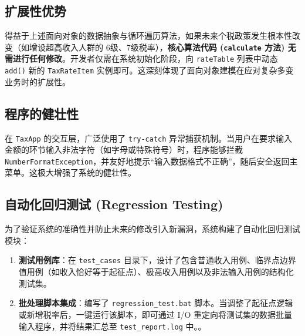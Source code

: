 \documentclass[a4paper]{article}
\begin{document}
\subsection{扩展性优势}
得益于上述面向对象的数据抽象与循环遍历算法，如果未来个税政策发生根本性改变（如增设超高收入人群的 6级、7级税率），\textbf{核心算法代码 (\texttt{calculate} 方法) 无需进行任何修改}。开发者仅需在系统初始化阶段，向 \texttt{rateTable} 列表中动态 \texttt{add()} 新的 \texttt{TaxRateItem} 实例即可。这深刻体现了面向对象建模在应对复杂多变业务时的扩展性。

\subsection{程序的健壮性}
在 \texttt{TaxApp} 的交互层，广泛使用了 \texttt{try-catch} 异常捕获机制。当用户在要求输入金额的环节输入非法字符（如字母或特殊符号）时，程序能够拦截 \texttt{NumberFormatException}，并友好地提示“输入数据格式不正确”，随后安全返回主菜单。这极大增强了系统的健壮性。

\subsection{自动化回归测试 (Regression Testing)}
为了验证系统的准确性并防止未来的修改引入新漏洞，系统构建了自动化回归测试模块：
\begin{enumerate}
    \item \textbf{测试用例库}：在 \texttt{test\_cases} 目录下，设计了包含普通收入用例、临界点边界值用例（如收入恰好等于起征点）、极高收入用例以及非法输入用例的结构化测试集。
    \item \textbf{批处理脚本集成}：编写了 \texttt{regression\_test.bat} 脚本。当调整了起征点逻辑或新增税率后，一键运行该脚本，即可通过 I/O 重定向将测试集的数据批量输入程序，并将结果汇总至 \texttt{test\_report.log} 中。。
\end{enumerate}
\end{document}

